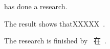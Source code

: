 \documentclass{ctexart}
\begin{document}
 has done a research.

The result shows thatXXXXX~\cite{konishi:1999ab}.

The research is finished by~\citeauthor{konishi:1999ab} 在~.


\end{document}
